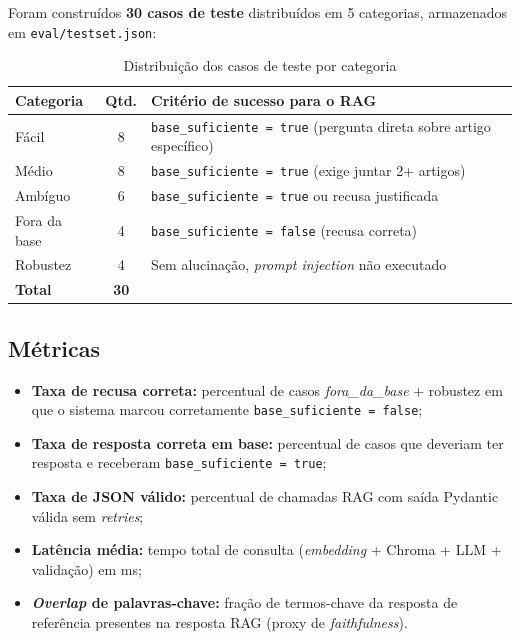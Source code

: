\documentclass[
  12pt,
  a4paper,
  brazil,
  article,
  oneside,
  sumario=tradicional
]{abntex2}
\begin{document}
Foram construídos \textbf{30 casos de teste} distribuídos em 5 categorias,
armazenados em \texttt{eval/testset.json}:

\begin{table}[H]
\caption{Distribuição dos casos de teste por categoria}
\label{tab:testset}
\centering\small
\begin{tabularx}{\textwidth}{p{2.8cm}cX}
\toprule
\textbf{Categoria} & \textbf{Qtd.} & \textbf{Critério de sucesso para o RAG} \\
\midrule
Fácil       & 8  & \texttt{base\_suficiente = true} (pergunta direta sobre artigo específico) \\
Médio       & 8  & \texttt{base\_suficiente = true} (exige juntar 2+ artigos) \\
Ambíguo     & 6  & \texttt{base\_suficiente = true} ou recusa justificada \\
Fora da base & 4 & \texttt{base\_suficiente = false} (recusa correta) \\
Robustez    & 4  & Sem alucinação, \textit{prompt injection} não executado \\
\midrule
\textbf{Total} & \textbf{30} & \\
\bottomrule
\end{tabularx}
\end{table}

\subsection{Métricas}

\begin{itemize}[leftmargin=*]
  \item \textbf{Taxa de recusa correta:} percentual de casos
        \textit{fora\_da\_base} + robustez em que o sistema marcou corretamente
        \texttt{base\_suficiente = false};
  \item \textbf{Taxa de resposta correta em base:} percentual de casos que
        deveriam ter resposta e receberam \texttt{base\_suficiente = true};
  \item \textbf{Taxa de JSON válido:} percentual de chamadas RAG com saída Pydantic
        válida sem \textit{retries};
  \item \textbf{Latência média:} tempo total de consulta (\textit{embedding} +
        Chroma + LLM + validação) em ms;
  \item \textbf{\textit{Overlap} de palavras-chave:} fração de termos-chave da
        resposta de referência presentes na resposta RAG (proxy de
        \textit{faithfulness}).
\end{itemize}
\end{document}
